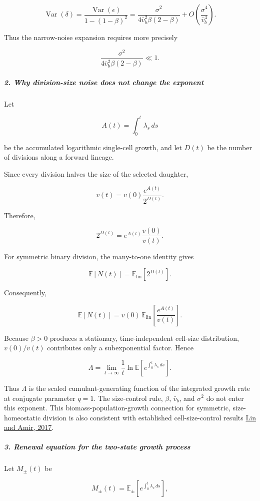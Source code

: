 \[
\operatorname{Var}(\delta) = \frac{\operatorname{Var}(\epsilon)} {1-(1-\beta)^2} = \frac{\sigma^2} {4\bar v_b^2\beta(2-\beta)} +O\!\left(\frac{\sigma^4}{\bar v_b^4}\right).
\]

Thus the narrow-noise expansion requires more precisely

\[
\frac{\sigma^2} {4\bar v_b^2\beta(2-\beta)}\ll1.
\]

\subparagraph*{2. Why division-size noise does not change the exponent}

Let

\[
A(t)=\int_0^t\lambda_s\,ds
\]

be the accumulated logarithmic single-cell growth, and let $D(t)$ be the number of divisions along a forward lineage.

Since every division halves the size of the selected daughter,

\[
v(t)=v(0)\frac{e^{A(t)}}{2^{D(t)}}.
\]

Therefore,

\[
2^{D(t)} = e^{A(t)}\frac{v(0)}{v(t)}.
\]

For symmetric binary division, the many-to-one identity gives

\[
\mathbb E[N(t)] = \mathbb E_{\mathrm{lin}}\!\left[2^{D(t)}\right].
\]

Consequently,

\[
\mathbb E[N(t)] = v(0)\, \mathbb E_{\mathrm{lin}} \left[ \frac{e^{A(t)}}{v(t)} \right].
\]

Because $\beta>0$ produces a stationary, time-independent cell-size distribution, $v(0)/v(t)$ contributes only a subexponential factor. Hence

\[
\Lambda = \lim_{t\to\infty} \frac{1}{t} \ln\mathbb E\!\left[ e^{\int_0^t\lambda_s\,ds} \right].
\]

Thus $\Lambda$ is the scaled cumulant-generating function of the integrated growth rate at conjugate parameter $q=1$. The size-control rule, $\beta$, $\bar v_b$, and $\sigma^2$ do not enter this exponent. This biomass-population-growth connection for symmetric, size-homeostatic division is also consistent with established cell-size-control results \href{\detokenize{https://doi.org/10.1016/j.cels.2017.08.015}}{Lin and Amir, 2017}.

\subparagraph*{3. Renewal equation for the two-state growth process}

Let $M_\pm(t)$ be

\[
M_\pm(t) = \mathbb E_\pm \left[ e^{\int_0^t\lambda_s\,ds} \right],
\]

